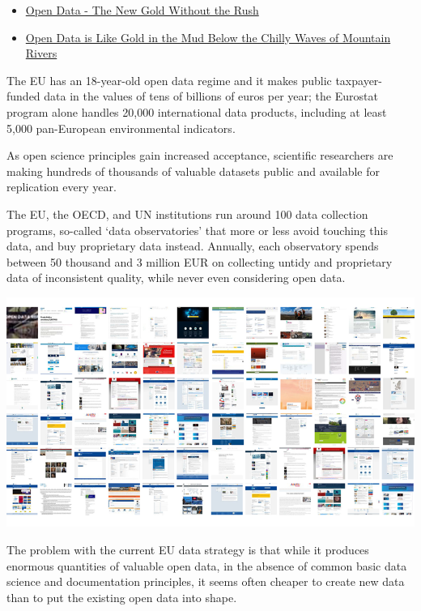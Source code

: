 \documentclass[
  a4paper,
  openany, a4paper, oneside]{book}
\providecommand{\tightlist}{%
  \setlength{\itemsep}{0pt}\setlength{\parskip}{0pt}}
\begin{document}
\begin{itemize}
\tightlist
\item
  \href{https://dataandlyrics.com/post/2021-06-18-gold-without-rush/}{Open Data - The New Gold Without the Rush}
\item
  \href{https://greendeal.dataobservatory.eu/post/2021-06-10-founder-daniel-antal/}{Open Data is Like Gold in the Mud Below the Chilly Waves of Mountain Rivers}
\end{itemize}

The EU has an 18-year-old open data regime and it makes public taxpayer-funded data in the values of tens of billions of euros per year; the Eurostat program alone handles 20,000 international data products, including at least 5,000 pan-European environmental indicators.

As open science principles gain increased acceptance, scientific researchers are making hundreds of thousands of valuable datasets public and available for replication every year.

The EU, the OECD, and UN institutions run around 100 data collection programs, so-called `data observatories' that more or less avoid touching this data, and buy proprietary data instead. Annually, each observatory spends between 50 thousand and 3 million EUR on collecting untidy and proprietary data of inconsistent quality, while never even considering open data.

\begin{center}\includegraphics[width=11.11in]{plots/screenshots/observatory_collage_16x9_800} \end{center}

The problem with the current EU data strategy is that while it produces enormous quantities of valuable open data, in the absence of common basic data science and documentation principles, it seems often cheaper to create new data than to put the existing open data into shape.
\end{document}
